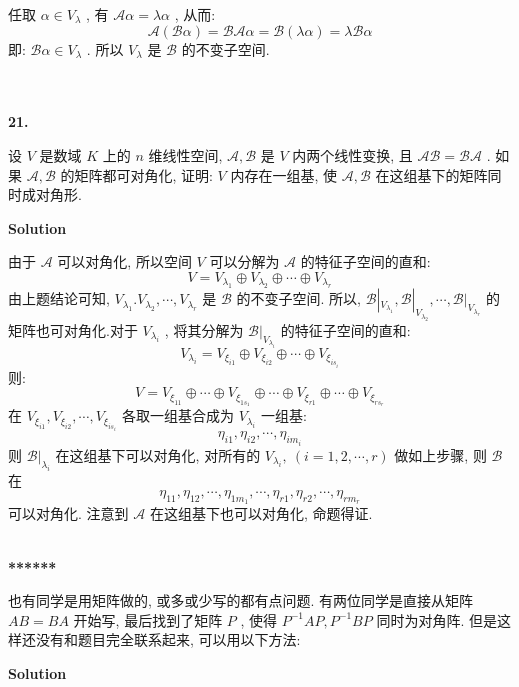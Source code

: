 \documentclass[11pt,a4paper,openany,oneside]{book}
\newcommand\Solution{\noindent\textbf{\textsf{Solution}}\par\medskip}
\begin{document}
任取 $ \alpha \in V_{\lambda} $ , 有 $ \mathcal{A}\alpha = \lambda\alpha $ , 从而:
 $$   \mathcal{A}(\mathcal{B}\alpha)  = \mathcal{BA}\alpha = \mathcal{B}(\lambda \alpha)  = \lambda\mathcal{B}\alpha  $$ 
即:  $ \mathcal{B}\alpha \in V_{\lambda} $ . 所以 $ V_{\lambda} $ 是 $ \mathcal{B} $ 的不变子空间.\\  \\  \\


\begin{myexample}
	\textbf{21.} 

设 $ V $ 是数域 $ K $ 上的 $ n $ 维线性空间,  $ \mathcal{A}, \mathcal{B} $ 是 $ V $ 内两个线性变换, 且 $ \mathcal{AB}=\mathcal{BA} $ . 如果 $ \mathcal{A}, \mathcal{B} $ 的矩阵都可对角化, 证明: $ V $ 内存在一组基, 使 $ \mathcal{A},\mathcal{B} $ 在这组基下的矩阵同时成对角形. \\

\end{myexample}
\Solution

由于 $ \mathcal{A} $ 可以对角化, 所以空间 $ V $ 可以分解为 $ \mathcal{A} $ 的特征子空间的直和:
 $$   V = V_{\lambda_1} \oplus  V_{\lambda_2} \oplus  \cdots \oplus  V_{\lambda_r}  $$ 
由上题结论可知,  $ V_{\lambda_1}. V_{\lambda_2}, \cdots, V_{\lambda_r} $ 是 $ \mathcal{B} $ 的不变子空间. 所以,  $ \mathcal{B}|_{V_{\lambda_1}}, \mathcal{B}|_{V_{\lambda_2}}, \cdots, \mathcal{B}|_{V_{\lambda_r}} $ 的矩阵也可对角化.对于 $ V_{\lambda_i} $ , 将其分解为 $ \mathcal{B}|_{V_{\lambda_i}} $ 的特征子空间的直和:
 $$  V_{\lambda_i} = V_{\xi_{i1}} \oplus  V_{\xi_{i2}} \oplus  \cdots \oplus  V_{\xi_{is_i}}  $$ 
则:
 $$  V = V_{\xi_{11}} \oplus  \cdots \oplus  V_{\xi_{1s_1}} \oplus  \cdots \oplus  V_{\xi_{r1}} \oplus  \cdots \oplus  V_{\xi_{rs_r}}  $$ 
在  $ V_{\xi_{i1}},  V_{\xi_{i2}},  \cdots , V_{\xi_{is_i}} $ 各取一组基合成为 $ V_{\lambda_i} $ 一组基:
 $$  \eta_{i1}, \eta_{i2}, \cdots, \eta_{im_i}  $$  
则 $ \mathcal{B}|_{\lambda_i} $ 在这组基下可以对角化, 对所有的 $ V_{\lambda_i}, \ (i=1, 2, \cdots, r) $ 做如上步骤, 则 $ \mathcal{B} $ 在
 $$  \eta_{11}, \eta_{12}, \cdots, \eta_{1m_1}, \cdots, \eta_{r1}, \eta_{r2}, \cdots, \eta_{rm_r}  $$  
可以对角化. 注意到 $ \mathcal{A} $ 在这组基下也可以对角化, 命题得证.  \\  \\  


\begin{myexample}
	\textbf{******}

也有同学是用矩阵做的, 或多或少写的都有点问题. 有两位同学是直接从矩阵 $ AB = BA $ 开始写, 最后找到了矩阵 $ P $ , 使得 $ P^{-1}AP, P^{-1}BP $ 同时为对角阵. 但是这样还没有和题目完全联系起来, 可以用以下方法: \\ 

\end{myexample}
\Solution
\end{document}
